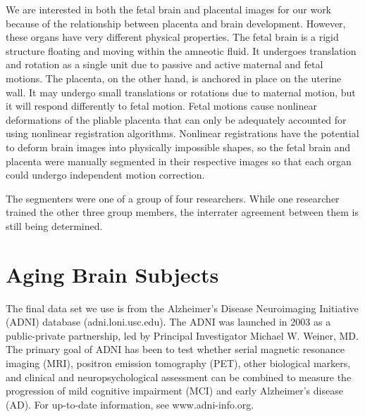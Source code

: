 We are interested in both the fetal brain and placental images for our work because of the relationship between placenta and brain development. However, these organs have very different physical properties. The fetal brain is a rigid structure floating and moving within the amneotic fluid. It undergoes translation and rotation as a single unit due to passive and active maternal and fetal motions. The placenta, on the other hand, is anchored in place on the uterine wall. It may undergo small translations or rotations due to maternal motion, but it will respond differently to fetal motion. Fetal motions cause nonlinear deformations of the pliable placenta that can only be adequately accounted for using nonlinear registration algorithms. Nonlinear registrations have the potential to deform brain images into physically impossible shapes, so the fetal brain and placenta were manually segmented in their respective images so that each organ could undergo independent motion correction. 

The segmenters were one of a group of four researchers. While one researcher trained the other three group members, the interrater agreement between them is still being determined.


\section{Aging Brain Subjects}

The final data set we use is from the Alzheimer's Disease Neuroimaging Initiative (ADNI) database (adni.loni.usc.edu). The ADNI was launched in 2003 as a public-private partnership, led by Principal Investigator Michael W. Weiner, MD. The primary goal of ADNI has been to test whether serial magnetic resonance imaging (MRI), positron emission tomography (PET), other biological markers, and clinical and neuropsychological assessment can be combined to measure the progression of mild cognitive impairment (MCI) and early Alzheimer's disease (AD). For up-to-date information, see www.adni-info.org.



